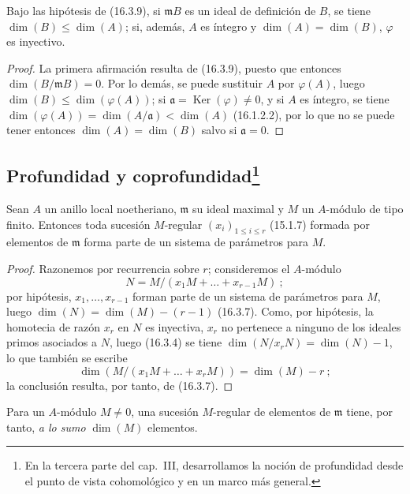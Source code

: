 \begin{corollary}[16.3.10]
\label{0.16.3.10-es}
Bajo las hipótesis de (16.3.9), si $\mathfrak{m}B$ es un ideal de definición
de $B$, se tiene $\dim(B)\leq\dim(A)$; si, además, $A$ es íntegro y
$\dim(A)=\dim(B)$, $\varphi$ es inyectivo.
\end{corollary}

\begin{proof}
La primera afirmación resulta de (16.3.9), puesto que entonces
$\dim(B/\mathfrak{m}B)=0$. Por lo demás, se puede sustituir $A$ por
$\varphi(A)$, luego $\dim(B)\leq\dim(\varphi(A))$; si
$\mathfrak{a}=\operatorname{Ker}(\varphi)\neq0$, y si $A$ es íntegro, se tiene
$\dim(\varphi(A))=\dim(A/\mathfrak{a})<\dim(A)$ (16.1.2.2), por lo que no se
puede tener entonces $\dim(A)=\dim(B)$ salvo si $\mathfrak{a}=0$.
\end{proof}

\subsection[Profundidad y coprofundidad]{Profundidad y
coprofundidad\protect\footnote{En la tercera parte del cap.~III, desarrollamos
la noción de profundidad desde el punto de vista cohomológico y en un marco
más general.}}
\label{subsection:0.16.4-es}

\begin{proposition}[16.4.1]
\label{0.16.4.1-es}
Sean $A$ un anillo local noetheriano, $\mathfrak{m}$ su ideal maximal y $M$ un
$A$-módulo de tipo finito. Entonces toda sucesión $M$-regular
$(x_i)_{1\leq i\leq r}$ (15.1.7) formada por elementos de $\mathfrak{m}$ forma
parte de un sistema de parámetros para $M$.
\end{proposition}

\begin{proof}
Razonemos por recurrencia sobre $r$; consideremos el $A$-módulo
\[
  N=M/(x_1M+\ldots+x_{r-1}M)~;
\]
por hipótesis, $x_1,\ldots,x_{r-1}$ forman parte de un sistema de parámetros
para $M$, luego $\dim(N)=\dim(M)-(r-1)$ (16.3.7). Como, por hipótesis, la
homotecia de razón $x_r$ en $N$ es inyectiva, $x_r$ no pertenece a ninguno de
los ideales primos asociados a $N$, luego (16.3.4) se tiene
$\dim(N/x_rN)=\dim(N)-1$, lo que también se escribe
\[
  \dim(M/(x_1M+\ldots+x_rM))=\dim(M)-r~;
\]
la conclusión resulta, por tanto, de (16.3.7).
\end{proof}

Para un $A$-módulo $M\neq0$, una sucesión $M$-regular de elementos de
$\mathfrak{m}$ tiene, por tanto, \emph{a lo sumo} $\dim(M)$ elementos.

